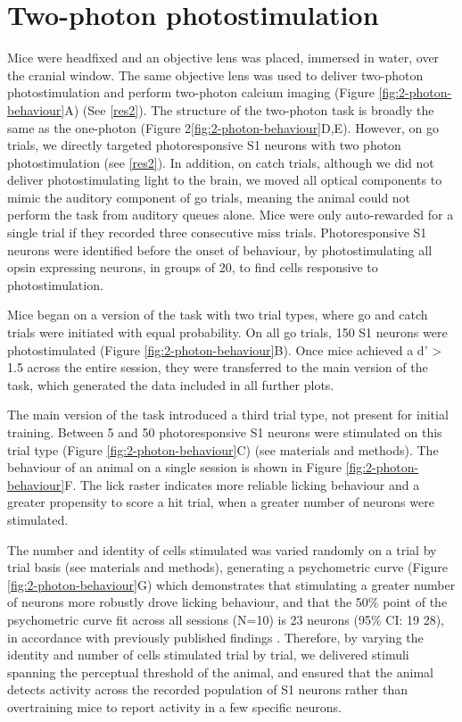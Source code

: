 \section{Two-photon photostimulation}

Mice were headfixed and an objective lens was placed, immersed in water, over the cranial window. The same objective lens was used to deliver two-photon photostimulation and perform two-photon calcium imaging (Figure \ref{fig:2-photon-behaviour}A) (See \ref{res2}). The structure of the two-photon task is broadly the same as the one-photon (Figure 2\ref{fig:2-photon-behaviour}D,E). However, on go trials, we directly targeted photoresponsive S1 neurons with two photon photostimulation (see \ref{res2}). In addition, on catch trials, although we did not deliver photostimulating light to the brain, we moved all optical components to mimic the auditory component of go trials, meaning the animal could not perform the task from auditory queues alone. Mice were only auto-rewarded for a single trial if they recorded three consecutive miss trials. Photoresponsive S1 neurons were identified before the onset of behaviour, by photostimulating all opsin expressing neurons, in groups of 20, to find cells responsive to photostimulation.

Mice began on a version of the task with two trial types, where go and catch trials were initiated with equal probability. On all go trials, 150 S1 neurons were photostimulated (Figure \ref{fig:2-photon-behaviour}B). Once mice achieved a d' > 1.5 across the entire session, they were transferred to the main version of the task, which generated the data included in all further plots.

The main version of the task introduced a third trial type, not present for initial training. Between 5 and 50 photoresponsive S1 neurons were stimulated on this trial type (Figure \ref{fig:2-photon-behaviour}C) (see materials and methods). The behaviour of an animal on a single session is shown in Figure \ref{fig:2-photon-behaviour}F. The lick raster indicates more reliable licking behaviour and a greater propensity to score a hit trial, when a greater number of neurons were stimulated.

The number and identity of cells stimulated was varied randomly on a trial by trial basis (see materials and methods), generating a psychometric curve (Figure \ref{fig:2-photon-behaviour}G) which demonstrates that stimulating a greater number of neurons more robustly drove licking behaviour, and that the 50\% point of the psychometric curve fit across all sessions (N=10) is 23 neurons (95\% CI: 19 28), in accordance with previously published findings \cite{dalgleish_how_2020}. Therefore, by varying the identity and number of cells stimulated trial by trial, we delivered stimuli spanning the perceptual threshold of the animal, and ensured that the animal detects activity across the recorded population of S1 neurons rather than overtraining mice to report activity in a few specific neurons.


